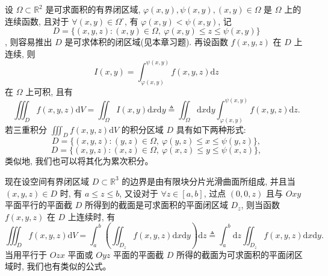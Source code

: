 \documentclass[12pt,fontset=fandol]{ctexart}
\begin{document}
设 $\Omega\subset\mathbb R^2$ 是可求面积的有界闭区域, $\varphi(x,y),\psi(x,y),(x,y)\in\Omega$ 是 $\Omega$ 上的连续函数, 且对于 $\forall(x,y)\in\Omega^\circ$, 有 $\varphi(x,y)<\psi(x,y)$, 记
\[
  D=\{(x,y,z):(x,y)\in\Omega,\ \varphi(x,y)\leqslant z\leqslant\psi(x,y)\}
\]
, 则容易推出 $D$ 是可求体积的闭区域(见本章习题). 再设函数 $f(x,y,z)$ 在 $D$ 上连续, 则
\[
  I(x,y)=\int_{\varphi(x,y)}^{\psi(x,y)}f(x,y,z)\mathrm dz
\]
在 $\Omega$ 上可积, 且有
\[
  \iiint_D f(x,y,z)\mathrm dV
  =\iint_\Omega I(x,y)\mathrm dx\mathrm dy
  \triangleq \iint_\Omega\mathrm dx\mathrm dy
    \int_{\varphi(x,y)}^{\psi(x,y)}f(x,y,z)\mathrm dz.
\]
若三重积分 $\iiint_D f(x,y,z)\mathrm dV$ 的积分区域 $D$ 具有如下两种形式:
\[
  D=\{(x,y,z):(y,z)\in\Omega,\ \varphi(y,z)\leqslant x\leqslant\psi(y,z)\},
\]
\[
  D=\{(x,y,z):(x,z)\in\Omega,\ \varphi(x,z)\leqslant y\leqslant\psi(x,z)\},
\]
类似地, 我们也可以将其化为累次积分。

现在设空间有界闭区域 $D\subset\mathbb R^3$ 的边界是由有限块分片光滑曲面所组成, 并且当 $(x,y,z)\in D$ 时, 有 $a\leqslant z\leqslant b$, 又设对于 $\forall z\in[a,b]$, 过点 $(0,0,z)$ 且与 $Oxy$ 平面平行的平面截 $D$ 所得到的截面是可求面积的平面闭区域 $D_z$, 则当函数 $f(x,y,z)$ 在 $D$ 上连续时, 有
\[
  \iiint_D f(x,y,z)\mathrm dV
  =\int_a^b\left(\iint_{D_z}f(x,y,z)\mathrm dx\mathrm dy\right)\mathrm dz
  \triangleq \int_a^b\mathrm dz\iint_{D_z}f(x,y,z)\mathrm dx\mathrm dy.
\]
当用平行于 $Ozx$ 平面或 $Oyz$ 平面的平面截 $D$ 所得的截面为可求面积的平面闭区域时, 我们也有类似的公式。
\end{document}
